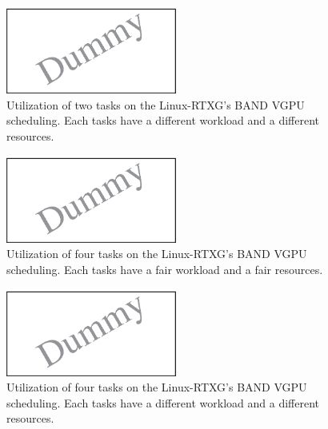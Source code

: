 \begin{figure}[t]
\begin{center}
\includegraphics[width=0.5\textwidth]{img/band_rtx}
\caption{Utilization of two tasks on the Linux-RTXG's BAND VGPU scheduling. Each tasks have a different workload and a different resources.}
\end{center}
\label{fig:band_rtx}
\end{figure}


\begin{figure}[t]
\begin{center}
\includegraphics[width=0.5\textwidth]{img/band_rtx_fair}
\caption{Utilization of four tasks on the Linux-RTXG's BAND VGPU scheduling. Each tasks have a fair workload and a fair resources.}
\end{center}
\label{fig:band_rtx_fair}
\end{figure}

\begin{figure}[t]
\begin{center}
\includegraphics[width=0.5\textwidth]{img/band_rtx_diff}
\caption{Utilization of four tasks on the Linux-RTXG's BAND VGPU scheduling. Each tasks have a different workload and a different resources.}
\end{center}
\label{fig:band_rtx}
\end{figure}

